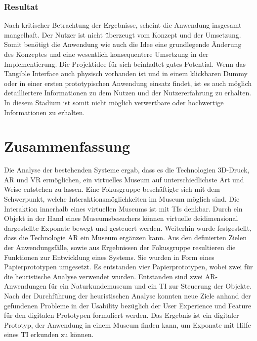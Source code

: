 \documentclass[runningheads,a4paper, 12pt]{llncs}
\begin{document}



\subsubsection{Resultat}
Nach kritischer Betrachtung der Ergebnisse, scheint die Anwendung insgesamt mangelhaft. Der Nutzer ist nicht überzeugt vom Konzept und der Umsetzung. Somit benötigt die Anwendung wie auch die Idee eine grundlegende Änderung des Konzeptes und eine wesentlich konsequentere Umsetzung in der Implementierung. Die Projektidee für sich beinhaltet gutes Potential. Wenn das Tangible Interface auch physisch vorhanden ist und in einem klickbaren Dummy oder in einer ersten prototypischen Anwendung einsatz findet, ist es auch möglich detailliertere Informationen zu dem Nutzen und der Nutzererfahrung zu erhalten. In diesem Stadium ist somit nicht möglich verwertbare oder hochwertige Informationen zu erhalten.


\section{Zusammenfassung}
Die Analyse der bestehenden Systeme ergab, dass es die Technologien 3D-Druck, AR und VR ermöglichen, ein virtuelles Museum auf unterschiedlichste Art und Weise entstehen zu lassen. Eine Fokusgruppe beschäftigte sich mit dem Schwerpunkt, welche Interaktionsmöglichkeiten im Museum möglich sind. Die Interaktion innerhalb eines virtuellen Museums ist mit TIs denkbar. Durch ein Objekt in der Hand eines Museumsbesuchers können virtuelle deidimensional dargestellte Exponate bewegt und gesteuert werden. Weiterhin wurde festgestellt, dass die Technologie AR ein Museum ergänzen kann. Aus den definierten Zielen der Anwendungsfälle, sowie aus Ergebnissen der Fokusgruppe resultieren die Funktionen zur Entwicklung eines Systems. Sie wurden in Form eines Papierprototypen umgesetzt. Es entstanden vier Papierprototypen, wobei zwei für die heuristische Analyse verwendet wurden. Entstanden sind zwei AR-Anwendungen für ein Naturkundemuseum und ein TI zur Steuerung der Objekte. Nach der Durchführung der heuristischen Analyse konnten neue Ziele anhand der gefundenen  Probleme in der Usability bezüglich der User Experience und Feature für den digitalen Prototypen formuliert werden. Das Ergebnis ist ein digitaler Prototyp, der Anwendung in einem Museum finden kann, um Exponate mit Hilfe eines TI erkunden zu können.\\ 


\newpage
 

\end{document}
